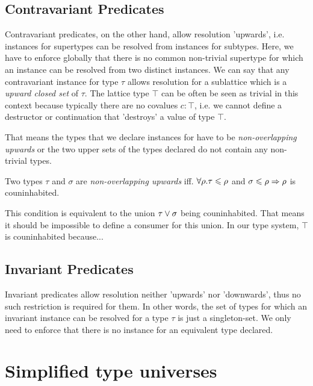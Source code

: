 \subsection{Contravariant Predicates}

Contravariant predicates, on the other hand, allow resolution 'upwards', i.e. instances for supertypes can be resolved from instances for subtypes.
Here, we have to enforce globally that there is no common non-trivial supertype for which an instance can be resolved from two distinct instances.
We can say that any contravariant instance for type $\tau$ allows resolution for a sublattice which is a \emph{upward closed set} of $\tau$.
The lattice type $\top$ can be often be seen as trivial in this context because typically there are no covalues $c : \top$, i.e. we cannot define a destructor or continuation that 'destroys' a value of type $\top$.

That means the types that we declare instances for have to be \emph{non-overlapping upwards} or the two upper sets of the types declared do not contain any non-trivial types.

\begin{definition}
  Two types $\tau$ and $\sigma$ are \emph{non-overlapping upwards} iff. $\forall\rho. \tau \leqslant \rho$ and $\sigma \leqslant \rho \Rightarrow \rho$ is couninhabited.
\end{definition}

This condition is equivalent to the union $\tau \vee \sigma$ being couninhabited.
That means it should be impossible to define a consumer for this union. %
In our type system, $\top$ is couninhabited because... 

\subsection{Invariant Predicates}

Invariant predicates allow resolution neither 'upwards' nor 'downwards', thus no such restriction is required for them.
In other words, the set of types for which an invariant instance can be resolved for a type $\tau$ is just a singleton-set.
We only need to enforce that there is no instance for an equivalent type declared.



\section{Simplified type universes}

